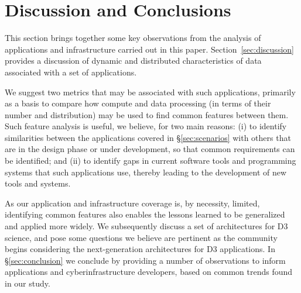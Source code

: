 %


\section{Discussion and Conclusions} \label{sec:conclusions}





This section brings together some key observations from the analysis of
applications and infrastructure carried out in this paper.
Section~\ref{sec:discussion} provides a discussion of dynamic and distributed
characteristics of data associated with a set of applications.


We suggest two metrics that may be associated with such applications, primarily
as a basis to compare how compute and data processing (in terms of their number
and distribution) may be used to find common features between them. Such feature
analysis is useful, we believe, for two main reasons: (i) to identify
similarities between the applications covered in \S\ref{sec:scenarios} with
others that are in the design phase or under development, so that common
requirements can be identified; and (ii) to identify gaps in current software
tools and programming systems that such applications use, thereby leading to the
development of new tools and systems.

As our application and infrastructure coverage is, by necessity, limited,
identifying common features also enables the lessons learned to be generalized
and applied more widely. We subsequently discuss a set of architectures for D3
science, and pose some questions we believe are pertinent as the community
begins considering the next-generation architectures for D3 applications. In
\S\ref{sec:conclusion} we conclude by providing a number of observations to
inform applications and cyberinfrastructure developers, based on common trends
found in our study.



